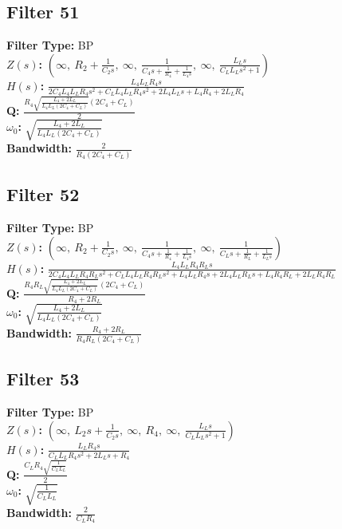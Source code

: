 \documentclass{article}
\begin{document}
\subsection*{Filter 51}
\textbf{Filter Type:} BP \\ 
\textbf{$Z(s)$:} $\left( \infty, \  R_{2} + \frac{1}{C_{2} s}, \  \infty, \  \frac{1}{C_{4} s + \frac{1}{R_{4}} + \frac{1}{L_{4} s}}, \  \infty, \  \frac{L_{L} s}{C_{L} L_{L} s^{2} + 1}\right)$ \\ 
\textbf{$H(s)$:} $\frac{L_{4} L_{L} R_{4} s}{2 C_{4} L_{4} L_{L} R_{4} s^{2} + C_{L} L_{4} L_{L} R_{4} s^{2} + 2 L_{4} L_{L} s + L_{4} R_{4} + 2 L_{L} R_{4}}$ \\ 
\textbf{Q:} $\frac{R_{4} \sqrt{\frac{L_{4} + 2 L_{L}}{L_{4} L_{L} \left(2 C_{4} + C_{L}\right)}} \left(2 C_{4} + C_{L}\right)}{2}$ \\ 
\textbf{$\omega_0$:} $\sqrt{\frac{L_{4} + 2 L_{L}}{L_{4} L_{L} \left(2 C_{4} + C_{L}\right)}}$ \\ 
\textbf{Bandwidth:} $\frac{2}{R_{4} \left(2 C_{4} + C_{L}\right)}$ \\ 
\subsection*{Filter 52}
\textbf{Filter Type:} BP \\ 
\textbf{$Z(s)$:} $\left( \infty, \  R_{2} + \frac{1}{C_{2} s}, \  \infty, \  \frac{1}{C_{4} s + \frac{1}{R_{4}} + \frac{1}{L_{4} s}}, \  \infty, \  \frac{1}{C_{L} s + \frac{1}{R_{L}} + \frac{1}{L_{L} s}}\right)$ \\ 
\textbf{$H(s)$:} $\frac{L_{4} L_{L} R_{4} R_{L} s}{2 C_{4} L_{4} L_{L} R_{4} R_{L} s^{2} + C_{L} L_{4} L_{L} R_{4} R_{L} s^{2} + L_{4} L_{L} R_{4} s + 2 L_{4} L_{L} R_{L} s + L_{4} R_{4} R_{L} + 2 L_{L} R_{4} R_{L}}$ \\ 
\textbf{Q:} $\frac{R_{4} R_{L} \sqrt{\frac{L_{4} + 2 L_{L}}{L_{4} L_{L} \left(2 C_{4} + C_{L}\right)}} \left(2 C_{4} + C_{L}\right)}{R_{4} + 2 R_{L}}$ \\ 
\textbf{$\omega_0$:} $\sqrt{\frac{L_{4} + 2 L_{L}}{L_{4} L_{L} \left(2 C_{4} + C_{L}\right)}}$ \\ 
\textbf{Bandwidth:} $\frac{R_{4} + 2 R_{L}}{R_{4} R_{L} \left(2 C_{4} + C_{L}\right)}$ \\ 
\subsection*{Filter 53}
\textbf{Filter Type:} BP \\ 
\textbf{$Z(s)$:} $\left( \infty, \  L_{2} s + \frac{1}{C_{2} s}, \  \infty, \  R_{4}, \  \infty, \  \frac{L_{L} s}{C_{L} L_{L} s^{2} + 1}\right)$ \\ 
\textbf{$H(s)$:} $\frac{L_{L} R_{4} s}{C_{L} L_{L} R_{4} s^{2} + 2 L_{L} s + R_{4}}$ \\ 
\textbf{Q:} $\frac{C_{L} R_{4} \sqrt{\frac{1}{C_{L} L_{L}}}}{2}$ \\ 
\textbf{$\omega_0$:} $\sqrt{\frac{1}{C_{L} L_{L}}}$ \\ 
\textbf{Bandwidth:} $\frac{2}{C_{L} R_{4}}$ \\ 
\end{document}
